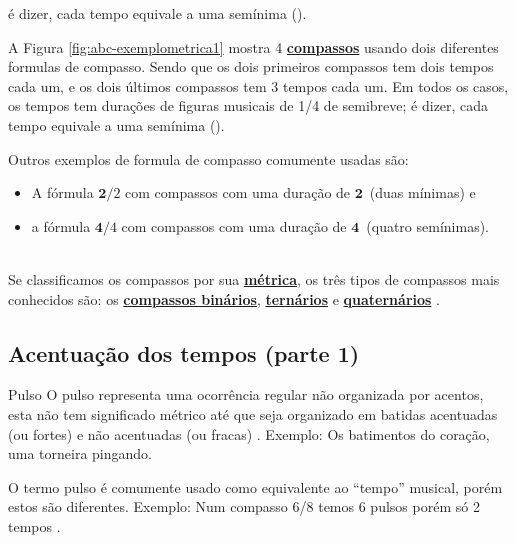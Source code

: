 \begin{description}
\begin{example}
é dizer, cada tempo equivale a uma semínima (\Vier). 
\end{example}
\begin{example}
A Figura \ref{fig:abc-exemplometrica1} mostra 4 \hyperref[def:Compasso]{\textbf{compassos}} usando dois diferentes formulas de compasso.
Sendo que os dois primeiros compassos tem dois tempos cada um, 
e os dois últimos compassos tem 3 tempos cada um.
Em todos os casos, os tempos tem durações de figuras musicais de 1/4 de semibreve;
é dizer, cada tempo equivale a uma semínima (\Vier). 
\end{example}
\begin{example}
Outros exemplos de formula de compasso comumente usadas são:
\begin{itemize}
\item A fórmula $\mathbf{2}/2$ com compassos com uma duração de $\mathbf{2}$\halfnote ~(duas mínimas) e
\item a fórmula $\mathbf{4}/4$ com compassos com uma duração de $\mathbf{4}$\quarternote ~(quatro semínimas). 
\end{itemize}
\end{example}
\end{description}~\\


Se classificamos os compassos por sua \hyperref[def:Metrica]{\textbf{métrica}}, 
os três tipos de compassos mais conhecidos são: 
os \hyperref[subsec:compassobinario]{\textbf{compassos binários}}, 
\hyperref[subsec:compassoternario]{\textbf{ternários}} e 
\hyperref[subsec:compassoquaternario]{\textbf{quaternários}} \cite[pp. 27]{adolfo2002musica}.



\subsection{Acentuação dos tempos (parte 1)}
\label{subsec:acentuacion1}



\begin{tcbinformation}{Pulso}
\label{ref:Pulso}
O pulso representa uma ocorrência regular não organizada por acentos,
esta não tem significado métrico até que seja organizado em batidas acentuadas (ou fortes) 
e não acentuadas (ou fracas) \cite[pp. 22]{holland2013music}. 
Exemplo: Os batimentos do coração, uma torneira pingando.

O termo pulso é comumente usado como equivalente ao ``tempo'' musical,
porém estos são diferentes.
Exemplo: Num compasso 6/8 temos 6 pulsos porém só 2 tempos \cite[pp. 1228]{latham2008diccionario}.
\end{tcbinformation} 

